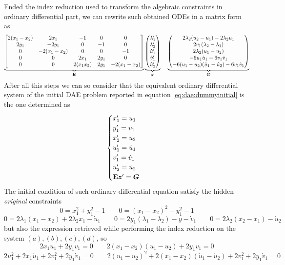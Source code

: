 	Ended the index reduction used to transform the algebraic constraints in ordinary differential part, we can rewrite such obtained ODEs in a matrix form as
	\[ \underbrace{ \begin{bmatrix}  2(x_1-x_2) & 2x_1 & - 1 & 0 & 0 \\
	2y_1 & -2y_1 & 0 & - 1 & 0 \\
	0 & -2(x_1-x_2) & 0 & 0 & -1 \\ 
	0 & 0 & 2x_1 & 2y_1 & 0 \\
	0 & 0 & 2(x_1 x_2) & 2y_1 & - 2(x_1 - x_2)  \end{bmatrix} }_{\mathbf{E}} \underbrace{\begin{pmatrix} \lambda_1' \\ \lambda_2' \\ \dot u_1' \\ \dot v_1' \\ \dot u_2' \end{pmatrix}}_{\boldsymbol{z}'} = \underbrace{\begin{pmatrix} 2\lambda_2 (u_2-u_1) - 2 \lambda_2 u_1 \\
	2v_1(\lambda_2 - \lambda_1) \\ 2 \lambda_2 (u_1- u_2) \\ -6u_1 \dot u_1 - 6v_1 \dot v_1 \\ - 6(u_1-u_2)(\dot u_1 - \dot u_2) - 6 v_1 \dot v_1 \end{pmatrix} }_{\boldsymbol{G}} \]
	After all this steps we can so consider that the equivalent ordinary differential system of the initial DAE problem reported in equation \ref{eq:dae:dummyinitial} is the one determined as
	\begin{equation}
	\begin{cases}
		x_1' = u_1 \\ y_1' = v_1 \\ x_2' = u_2 \\ u_1' = \dot u_1 \\ v_1' = \dot v_1 \\ u_2' = \dot u_2 \\
		\mathbf{E} \boldsymbol{z}' = \boldsymbol{G}
	\end{cases}
	\end{equation}
	The initial condition of such ordinary differential equation satisfy the hidden \textit{original} constraints
	\[ 0 = x_1^2 + y_1^2 - 1 \qquad 0 = (x_1-x_2)^2 + y_1^2 - 1 \]
	\[ 0 = 2\lambda_1(x_1-x_2) + 2 \lambda_2 x_1 - \dot u_1 \qquad 0 = 2y_1(\lambda_1-\lambda_2) - y - \dot v_1 \qquad 0 =  2\lambda_2 (x_2-x_1) - \dot u_2  \]
	but also the expression retrieved while performing the index reduction on the system $(a),(b),(c),(d)$, so
	\[ 2x_1u_1 + 2 y_1 v_1 = 0 \qquad 2(x_1-x_2)(u_1-u_2) + 2 y_1 v_1 = 0 \]
	\[ 2 u_1^2 + 2x_1 \dot u_1 + 2 v_1^2 + 2 y_1 \dot v_1 = 0 \qquad 2 (u_1 - u_2)^2 + 2 (x_1 - x_2)(\dot u_1 - \dot u_2) +2 v_1^2 +2 y_1 \dot v_1 = 0   \]

